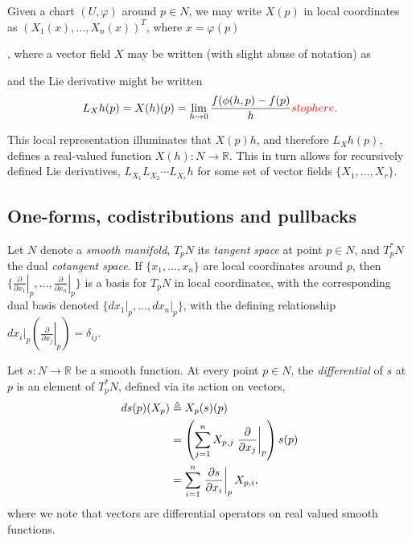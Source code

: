 \documentclass[psamsfonts]{amsart}
\theoremstyle{definition}
\theoremstyle{remark}
\newcommand*\R{\mathds{R}}
\newcommand*\isdefined{\triangleq}
\numberwithin{equation}{section}
\begin{document}
Given a chart $(U, \varphi)$ around $p\in N$, we may write $X(p)$ in local coordinates as $(X_1(x), \dots, X_n(x))^T$, where $x = \varphi(p)$



, where a vector field $X$ may be written (with slight abuse of notation) as

 and the Lie derivative might be written 
\begin{align}
L_Xh(p) = X(h)(p) = \lim_{h\rightarrow 0}\frac{f(\phi(h, p)-f(p)}{h}{\color{red} stop here. }
\end{align}

This local representation illuminates that $X(p)h$, and therefore $L_Xh(p)$, defines a real-valued function $X(h):N\rightarrow \R$. This in turn allows for recursively defined Lie derivatives, $L_{X_{1}}L_{X_{2}}\cdots L_{X_{r}}h$ for some set of vector fields $\{X_1, \dots , X_r\}$.


\subsection{One-forms, codistributions and pullbacks}
Let $N$ denote a \textit{smooth manifold}, $T_pN $ its \textit{tangent space} at point $p \in N$, and $T^*_pN$ the dual \textit{cotangent space}. If $\{x_1, \dots, x_n\}$ are local coordinates around $p$, then
 $\{\left.\frac{\partial}{\partial x_1}\right\rvert_p,\dots, \left.\frac{\partial}{\partial x_n}\right\rvert_p \}$ is a basis for $T_pN$ in local coordinates, with the corresponding dual basis denoted $\{dx_1\vert_p, \dots, dx_n\vert_p\}$, with the defining relationship $dx_i\vert_p \left(\left.\frac{\partial}{\partial x_j}\right\rvert_p\right) = \delta_{ij}$. 
 
 Let $s: N \rightarrow \R$ be a smooth function. At every point $p \in N$, the \textit{differential} of $s$ at $p$ is an element of $T^*_pN$, defined via its action on vectors, 
\begin{align}
    ds(p)(X_p) & \isdefined X_p(s)(p) \label{def:differential} \\%
     & = \left(\sum_{j = 1}^nX_{p, j}\left.\frac{\partial}{\partial x_j}\right\rvert_p\right)s(p) \notag \\
     & = \sum_{i = 1}^n \left.\frac{\partial s}{\partial x_i} \right\rvert_p X_{p, i}, \notag
\end{align}
where we note that vectors are differential operators on real valued smooth functions. 
\end{document}
